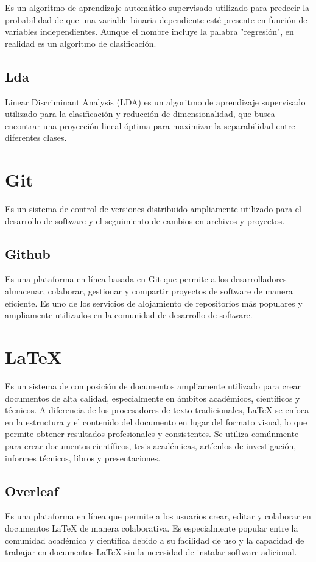Es un algoritmo de aprendizaje automático supervisado utilizado para predecir la probabilidad de que una variable binaria dependiente esté presente en función de variables independientes. Aunque el nombre incluye la palabra "regresión", en realidad es un algoritmo de clasificación.

\subsection{Lda} \label{lda}

Linear Discriminant Analysis (LDA) es un algoritmo de aprendizaje supervisado utilizado para la clasificación y reducción de dimensionalidad, que busca encontrar una proyección lineal óptima para maximizar la separabilidad entre diferentes clases.

\section{Git}

Es un sistema de control de versiones distribuido ampliamente utilizado para el desarrollo de software y el seguimiento de cambios en archivos y proyectos. 

\subsection{Github}

Es una plataforma en línea basada en Git que permite a los desarrolladores almacenar, colaborar, gestionar y compartir proyectos de software de manera eficiente. Es uno de los servicios de alojamiento de repositorios más populares y ampliamente utilizados en la comunidad de desarrollo de software.

\section{\LaTeX}

Es un sistema de composición de documentos ampliamente utilizado para crear documentos de alta calidad, especialmente en ámbitos académicos, científicos y técnicos. A diferencia de los procesadores de texto tradicionales, LaTeX se enfoca en la estructura y el contenido del documento en lugar del formato visual, lo que permite obtener resultados profesionales y consistentes. Se utiliza comúnmente para crear documentos científicos, tesis académicas, artículos de investigación, informes técnicos, libros y presentaciones.

\subsection{Overleaf}

Es una plataforma en línea que permite a los usuarios crear, editar y colaborar en documentos LaTeX de manera colaborativa. Es especialmente popular entre la comunidad académica y científica debido a su facilidad de uso y la capacidad de trabajar en documentos LaTeX sin la necesidad de instalar software adicional.